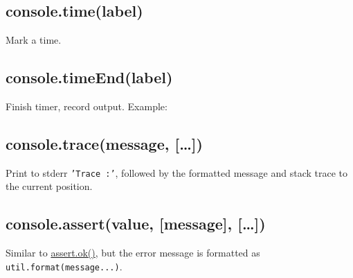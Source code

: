 \subsection{console.time(label)}\label{console.timelabel}

Mark a time.

\subsection{console.timeEnd(label)}\label{console.timeendlabel}

Finish timer, record output. Example:

\begin{Shaded}
\begin{Highlighting}[]
\NormalTok{(}\NormalTok{);}
 \NormalTok{(} 
  \NormalTok{;}
\NormalTok{\}}
\NormalTok{(}\NormalTok{);}
\end{Highlighting}
\end{Shaded}

\subsection{console.trace(message,
{[}\ldots{}{]})}\label{console.tracemessage}

Print to stderr \texttt{'Trace :'}, followed by the formatted message
and stack trace to the current position.

\subsection{console.assert(value, {[}message{]},
{[}\ldots{}{]})}\label{console.assertvalue-message}

Similar to
\href{assert.html\#assert_assert_value_message_assert_ok_value_message}{assert.ok()},
but the error message is formatted as \texttt{util.format(message...)}.
